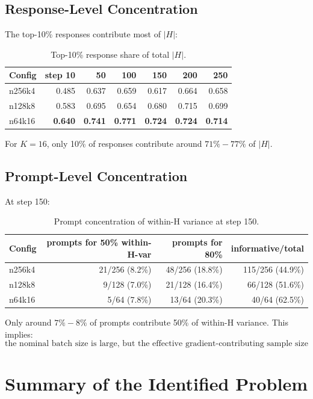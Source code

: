\documentclass[11pt,a4paper]{article}
\begin{document}
\subsection{Response-Level Concentration}

The top-10\% responses contribute most of \(|H|\):

\begin{table}[h]
\centering
\begin{tabular}{lrrrrrr}
\toprule
Config & step 10 & 50 & 100 & 150 & 200 & 250\\
\midrule
n256k4 & 0.485 & 0.637 & 0.659 & 0.617 & 0.664 & 0.658\\
n128k8 & 0.583 & 0.695 & 0.654 & 0.680 & 0.715 & 0.699\\
n64k16 & \textbf{0.640} & \textbf{0.741} & \textbf{0.771} & \textbf{0.724} & \textbf{0.724} & \textbf{0.714}\\
\bottomrule
\end{tabular}
\caption{Top-10\% response share of total \(|H|\).}
\end{table}

For \(K=16\), only 10\% of responses contribute around \(71\%-77\%\) of \(|H|\).

\subsection{Prompt-Level Concentration}

At step 150:

\begin{table}[h]
\centering
\begin{tabular}{lrrr}
\toprule
Config & prompts for 50\% within-H-var & prompts for 80\% & informative/total\\
\midrule
n256k4 & 21/256 (8.2\%) & 48/256 (18.8\%) & 115/256 (44.9\%)\\
n128k8 & 9/128 (7.0\%) & 21/128 (16.4\%) & 66/128 (51.6\%)\\
n64k16 & 5/64 (7.8\%) & 13/64 (20.3\%) & 40/64 (62.5\%)\\
\bottomrule
\end{tabular}
\caption{Prompt concentration of within-H variance at step 150.}
\end{table}

Only around \(7\%-8\%\) of prompts contribute 50\% of within-H variance. This implies:
\[
\boxed{
\text{the nominal batch size is large, but the effective gradient-contributing sample size is much smaller.}
}
\]

\section{Summary of the Identified Problem}
\end{document}
